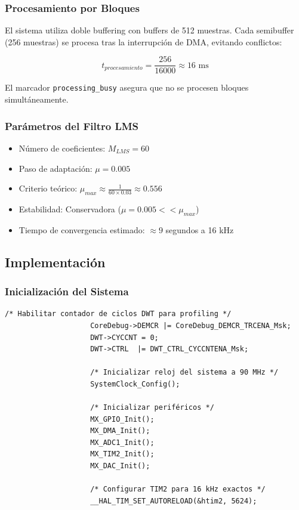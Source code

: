 \documentclass[12pt]{article}
\begin{document}
			\subsubsection{Procesamiento por Bloques}

				El sistema utiliza doble buffering con buffers de 512 muestras. Cada semibuffer (256 muestras) se procesa tras la interrupción de DMA, evitando conflictos:

				\[
				t_{procesamiento} = \frac{256}{16000} \approx 16 \text{ ms}
				\]

				El marcador \texttt{processing\_busy} asegura que no se procesen bloques simultáneamente.

			\subsubsection{Parámetros del Filtro LMS}

				\begin{itemize}
					\item Número de coeficientes: $M_{LMS} = 60$
					\item Paso de adaptación: $\mu = 0.005$
					\item Criterio teórico: $\mu_{max} \approx \frac{1}{60 \times 0.03} \approx 0.556$
					\item Estabilidad: Conservadora ($\mu = 0.005 << \mu_{max}$)
					\item Tiempo de convergencia estimado: $\approx 9$ segundos a 16 kHz
				\end{itemize}

		\subsection{Implementación}

			\subsubsection{Inicialización del Sistema}

				\begin{lstlisting}[style=mystyle]
					/* Habilitar contador de ciclos DWT para profiling */
					CoreDebug->DEMCR |= CoreDebug_DEMCR_TRCENA_Msk;
					DWT->CYCCNT = 0;
					DWT->CTRL  |= DWT_CTRL_CYCCNTENA_Msk;

					/* Inicializar reloj del sistema a 90 MHz */
					SystemClock_Config();

					/* Inicializar periféricos */
					MX_GPIO_Init();
					MX_DMA_Init();
					MX_ADC1_Init();
					MX_TIM2_Init();
					MX_DAC_Init();

					/* Configurar TIM2 para 16 kHz exactos */
					__HAL_TIM_SET_AUTORELOAD(&htim2, 5624);
				\end{lstlisting}
\end{document}
